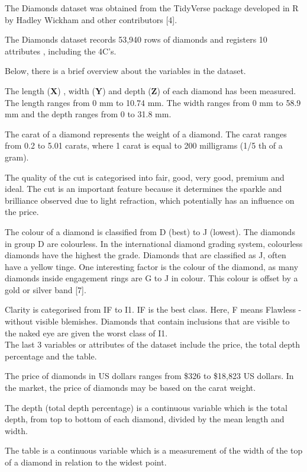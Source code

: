 \documentclass[
]{article}
\begin{document}
The Diamonds dataset was obtained from the TidyVerse package developed
in R by Hadley Wickham and other contributors {[}4{]}.

The Diamonds dataset records 53,940 rows of diamonds and registers 10
attributes , including the 4C's.

Below, there is a brief overview about the variables in the dataset.

The length (\textbf{X}) , width (\textbf{Y}) and depth (\textbf{Z}) of
each diamond has been measured. The length ranges from 0 mm to 10.74 mm.
The width ranges from 0 mm to 58.9 mm and the depth ranges from 0 to
31.8 mm.

The carat of a diamond represents the weight of a diamond. The carat
ranges from 0.2 to 5.01 carats, where 1 carat is equal to 200 milligrams
(1/5 th of a gram).

The quality of the cut is categorised into fair, good, very good,
premium and ideal. The cut is an important feature because it determines
the sparkle and brilliance observed due to light refraction, which
potentially has an influence on the price.

The colour of a diamond is classified from D (best) to J (lowest). The
diamonds in group D are colourless. In the international diamond grading
system, colourless diamonds have the highest the grade. Diamonds that
are classified as J, often have a yellow tinge. One interesting factor
is the colour of the diamond, as many diamonds inside engagement rings
are G to J in colour. This colour is offset by a gold or silver band
{[}7{]}.

Clarity is categorised from IF to I1. IF is the best class. Here, F
means Flawless - without visible blemishes. Diamonds that contain
inclusions that are visible to the naked eye are given the worst class
of I1.\\
The last 3 variables or attributes of the dataset include the price, the
total depth percentage and the table.

The price of diamonds in US dollars ranges from \$326 to \$18,823 US
dollars. In the market, the price of diamonds may be based on the carat
weight.

The depth (total depth percentage) is a continuous variable which is the
total depth, from top to bottom of each diamond, divided by the mean
length and width.

The table is a continuous variable which is a measurement of the width
of the top of a diamond in relation to the widest point.
\end{document}
